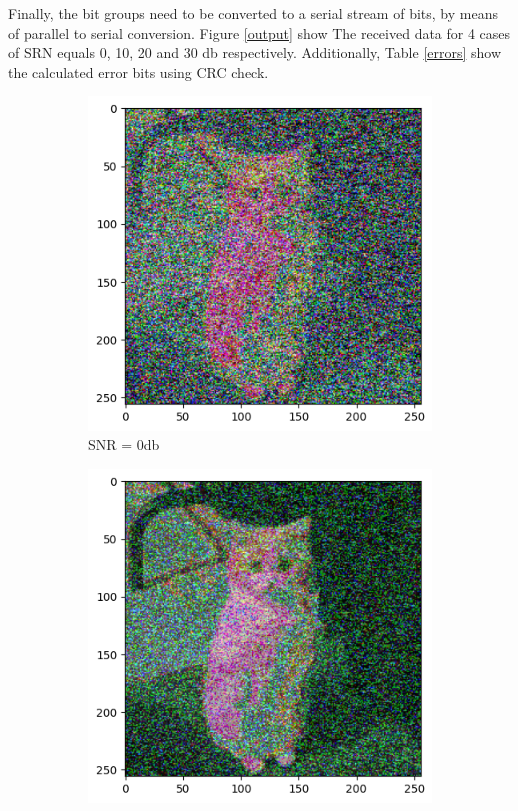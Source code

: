 Finally, the bit groups need to be converted to a serial stream of bits, by means of parallel to serial conversion. Figure \ref{output} show The received data for 4 cases of SRN equals 0, 10, 20 and 30 db respectively. Additionally, Table \ref{errors} show the calculated error bits using CRC check.

\begin{figure}[htbp]
    \centering
    \begin{subfigure}[t]{.49\linewidth}
        \includegraphics[width=\linewidth]{../Source/results/output_0db}
        \caption{SNR = 0db}
        \label{0db}
    \end{subfigure}
    \hfil
    \begin{subfigure}[t]{0.49\linewidth}
        \includegraphics[width=\linewidth]{../Source/results/output_10db}

\end{subfigure}
\end{figure}
